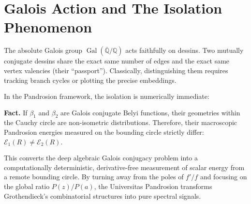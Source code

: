 \documentclass[10pt,a4paper,oneside]{book}
\theoremstyle{definition}
\theoremstyle{remark}
\begin{document}
\section{Galois Action and The Isolation Phenomenon}

The absolute Galois group $\operatorname{Gal}(\overline{\mathbb{Q}}/\mathbb{Q})$ acts faithfully on dessins. Two mutually conjugate dessins share the exact same number of edges and the exact same vertex valencies (their ``passport''). Classically, distinguishing them requires tracking branch cycles or plotting the precise embeddings.

In the Pandrosion framework, the isolation is numerically immediate:

\textbf{Fact.} If $\beta_1$ and $\beta_2$ are Galois conjugate Belyi functions, their geometries within the Cauchy circle are non-isometric distributions. Therefore, their macroscopic Pandrosion energies measured on the bounding circle strictly differ: $\mathcal{E}_1(R) \neq \mathcal{E}_2(R)$.

This converts the deep algebraic Galois conjugacy problem into a computationally deterministic, derivative-free measurement of scalar energy from a remote bounding circle. By turning away from the poles of $f'/f$ and focusing on the global ratio $P(z)/P(a)$, the Universitas Pandrosion transforms Grothendieck's combinatorial structures into pure spectral signals.
\end{document}
